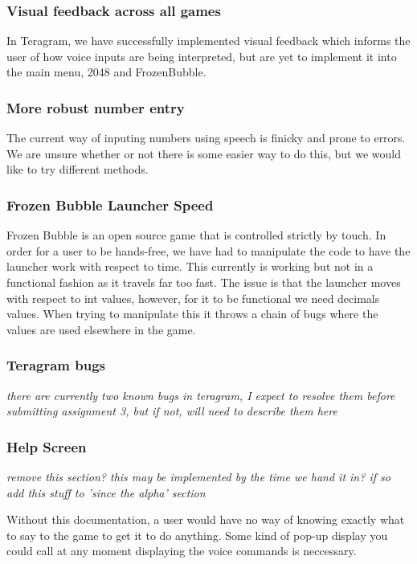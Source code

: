 \documentclass[11pt, oneside]{article}
\begin{document}
\subsubsection*{Visual feedback across all games}
In Teragram, we have successfully implemented visual feedback which
informs the user of how voice inputs are being interpreted, but are
yet to implement it into the main menu, 2048 and FrozenBubble.


\subsubsection*{More robust number entry}
The current way of inputing numbers using speech is finicky and prone to
errors. We are unsure whether or not there is some easier way to do this,
but we would like to try different methods.


\subsubsection*{Frozen Bubble Launcher Speed}
Frozen Bubble is an open source game that is controlled strictly by touch. 
In order for a user to be hands-free, we have had to manipulate the code 
to have the launcher work with respect to time. This currently is working
but not in a functional fashion as it travels far too fast. The issue is 
that the launcher moves with respect to int values, however, for it to be 
functional we need decimals values. When trying to manipulate this it 
throws a chain of bugs where the values are used elsewhere in the game. 

\subsubsection*{Teragram bugs}

{\em there are currently two known bugs in teragram, I expect to
  resolve them before submitting assignment 3, but if not, will need
  to describe them here}

\subsubsection*{Help Screen}

{\em remove this section? this may be implemented by the time we hand
  it in? if so add this stuff to 'since the alpha' section}

Without this documentation, a user would have no way of knowing
exactly what to say to the game to get it to do anything. Some kind of
pop-up display you could call at any moment displaying the voice
commands is neccessary.
\end{document}
